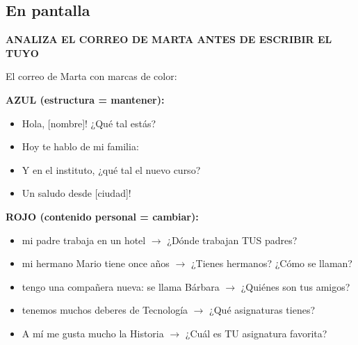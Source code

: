 \documentclass[a4paper,11pt]{article}
\begin{document}
\vspace{0.5cm}

\subsection*{En pantalla}

\begin{center}
{\Large\textbf{ANALIZA EL CORREO DE MARTA ANTES DE ESCRIBIR EL TUYO}}
\end{center}

\vspace{0.3cm}

El correo de Marta con marcas de color:

\vspace{0.3cm}

\noindent\textbf{\textcolor{azulg}{AZUL (estructura = mantener):}}
\begin{itemize}[leftmargin=2cm, itemsep=2pt]
\item \textcolor{azulg}{Hola, [nombre]! ¿Qué tal estás?}
\item \textcolor{azulg}{Hoy te hablo de mi familia:}
\item \textcolor{azulg}{Y en el instituto, ¿qué tal el nuevo curso?}
\item \textcolor{azulg}{Un saludo desde [ciudad]!}
\end{itemize}

\vspace{0.2cm}

\noindent\textbf{\textcolor{rojog}{ROJO (contenido personal = cambiar):}}
\begin{itemize}[leftmargin=2cm, itemsep=2pt]
\item \textcolor{rojog}{mi padre trabaja en un hotel} $\rightarrow$ ¿Dónde trabajan TUS padres?
\item \textcolor{rojog}{mi hermano Mario tiene once años} $\rightarrow$ ¿Tienes hermanos? ¿Cómo se llaman?
\item \textcolor{rojog}{tengo una compañera nueva: se llama Bárbara} $\rightarrow$ ¿Quiénes son tus amigos?
\item \textcolor{rojog}{tenemos muchos deberes de Tecnología} $\rightarrow$ ¿Qué asignaturas tienes?
\item \textcolor{rojog}{A mí me gusta mucho la Historia} $\rightarrow$ ¿Cuál es TU asignatura favorita?
\end{itemize}

\vspace{0.3cm}
\end{document}
